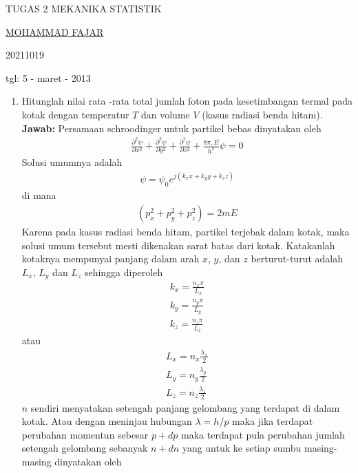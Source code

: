 \documentclass[a4paper , 12 pt]{article}
\begin{document}
\begin {singlespace}
\centering
TUGAS 2 MEKANIKA STATISTIK

\underline{MOHAMMAD FAJAR} 

20211019

tgl: 5 - maret - 2013
\end{singlespace}

\begin{enumerate}
\item 
Hitunglah nilai rata -rata total jumlah foton pada kesetimbangan termal pada kotak dengan temperatur $T$ dan volume $V$  (kasus radiasi benda hitam). \newline
\textbf{Jawab:}\newline
Persamaan schroodinger untuk partikel bebas  dinyatakan oleh
\begin{align}
\frac{\partial^2 \psi}{\partial x^2} +\frac{\partial^2 \psi}{\partial y^2} +\frac{\partial^2 \psi}{\partial z^2} + \frac{8\pi ,E}{h^2} \psi = 0 \tag{i.1} 
\end{align}
Solusi umumnya adalah  
\begin{align}
\psi = \psi_0 e^{j(k_x x + k_y y + k_z z)} \tag{i.2}
\end{align}
di mana
\begin{align}
(p_x^2  + p_y^2 + p_z^2 ) = 2 m E \nonumber \tag{i.3}
\end{align}
Karena pada kasus radiasi benda hitam, partikel terjebak dalam kotak, maka solusi umum tersebut mesti dikenakan sarat batas dari kotak. Katakanlah kotaknya mempunyai panjang dalam arah $x$,  $y$, dan $z$ berturut-turut adalah  $L_x$, $L_y$ dan $L_z$
sehingga diperoleh
\begin{align}
k_x  = \frac{n_x \pi}{L_x}  \nonumber \\
k_y  = \frac{n_y \pi}{L_y} \nonumber \tag{i.4}\\
k_z = \frac{n_z \pi }{L_z} \nonumber
\end{align} 
atau
\begin{align}
L_x = n_x \frac{\lambda_x}{2} \nonumber \\
L_y = n_y \frac{\lambda_y}{2} \nonumber \tag{i.5} \\
L_z = n_z \frac{\lambda_z}{2} \nonumber
\end{align}
$n$ sendiri menyatakan setengah panjang gelombang yang terdapat di dalam kotak. Atau dengan meninjau hubungan $\lambda = h/p$ maka jika terdapat perubahan momentun sebesar $p  + dp$ maka terdapat pula perubahan jumlah setengah gelombang sebanyak $n + dn $ yang untuk ke setiap sumbu masing-masing dinyatakan oleh

\end{enumerate}
\end{document}

